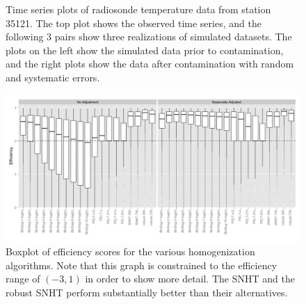 \documentclass[12pt]{article}
\providecommand{\DIFaddbeginFL}{} %
\providecommand{\DIFaddendFL}{} %
\providecommand{\DIFdelbeginFL}{} %
\providecommand{\DIFdelendFL}{} %
\begin{document}
\begin{figure}
	\caption{Time series plots of radiosonde temperature data from station 35121.  The top plot shows the observed time series, and the following 3 pairs show three realizations of simulated datasets.  The plots on the left show the simulated data prior to contamination, and the right plots show the data after contamination with random and systematic errors.}
	\label{fig:simExample}
\end{figure}

\begin{figure}[h!]
	\centering
	\DIFdelbeginFL %
\DIFdelendFL \DIFaddbeginFL \includegraphics[width=\textwidth]{Efficiency_Model_Plot_BW_seas_adj.png}
	\DIFaddendFL \caption{Boxplot of efficiency scores for the various homogenization algorithms.  Note that this graph is constrained to the efficiency range of $(-3,1)$ in order to show more detail.  The SNHT and the robust SNHT perform substantially  better than their alternatives.}
	\label{fig:homEfficiency}
\end{figure}
\end{document}
